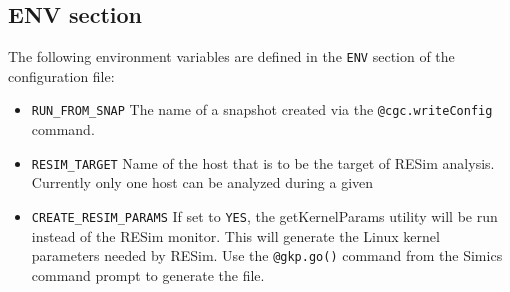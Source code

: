 \documentclass[titlepage]{article}
\begin{document}
\subsection{ENV section}
The following environment variables are defined in the {\tt ENV} section of the configuration file:
\begin{itemize}
\item {\tt RUN\_FROM\_SNAP} The name of a snapshot created via the {\tt @cgc.writeConfig} command.
\item {\tt RESIM\_TARGET} Name of the host that is to be the target of RESim analysis.  Currently only one host can be analyzed during a given
\item {\tt CREATE\_RESIM\_PARAMS} If set to {\tt YES}, the getKernelParams utility will be run instead of the RESim monitor.  This will
generate the Linux kernel parameters needed by RESim.  Use the {\tt @gkp.go()} command from the Simics command prompt to generate the file.
\end{itemize}
\end{document}
